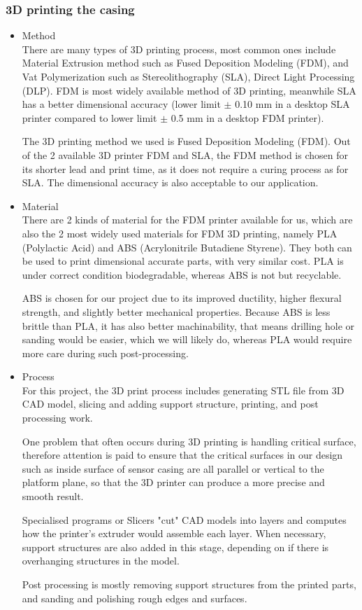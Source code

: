 \subsubsection{3D printing the casing}
\begin{itemize}
    \item Method\\ 
    There are many types of 3D printing process, most common ones include Material Extrusion method such as Fused Deposition Modeling (FDM), and Vat Polymerization such as Stereolithography (SLA), Direct Light Processing (DLP). FDM is most widely available method of 3D printing, meanwhile SLA has a better dimensional accuracy (lower limit $\pm$ 0.10 mm in a desktop SLA printer compared to lower limit $\pm$ 0.5 mm in a desktop FDM printer).

    The 3D printing method we used is Fused Deposition Modeling (FDM). Out of the 2 available 3D printer FDM and SLA, the FDM method is chosen for its shorter lead and print time, as it does not require a curing process as for SLA. The dimensional accuracy is also acceptable to our application.
    
    

    \item Material\\ 
    There are 2 kinds of material for the FDM printer available for us, which are also the 2 most widely used materials for FDM 3D printing, namely PLA (Polylactic Acid) and ABS (Acrylonitrile Butadiene Styrene). They both can be used to print dimensional accurate parts, with very similar cost. PLA is under correct condition biodegradable, whereas ABS is not but recyclable.

    ABS is chosen for our project due to its improved ductility, higher flexural strength, and slightly better mechanical properties. Because ABS is less brittle than PLA, it has also better machinability, that means drilling hole or sanding would be easier, which we will likely do, whereas PLA would require more care during such post-processing.

    \item Process\\ 
    For this project, the 3D print process includes generating STL file from 3D CAD model, slicing and adding support structure, printing, and post processing work.

    One problem that often occurs during 3D printing is handling critical surface, therefore attention is paid to ensure that the critical surfaces in our design such as inside surface of sensor casing are all parallel or vertical to the platform plane, so that the 3D printer can produce a more precise and smooth result.

    Specialised programs or Slicers "cut" CAD models into layers and computes how the printer's extruder would assemble each layer. When necessary, support structures are also added in this stage, depending on if there is overhanging structures in the model.

    Post processing is mostly removing support structures from the printed parts, and sanding and polishing rough edges and surfaces.
\end{itemize}

\FloatBarrier
\vspace{1cm}


